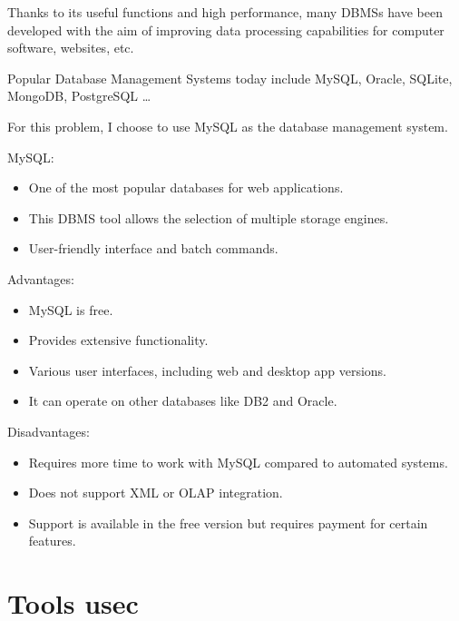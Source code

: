 \documentclass[../Main.tex]{subfiles}
\begin{document}
Thanks to its useful functions and high performance, many DBMSs have been developed with the aim of improving data processing capabilities for computer software, websites, etc.

Popular Database Management Systems today include MySQL, Oracle, SQLite, MongoDB, PostgreSQL \dots

For this problem, I choose to use MySQL as the database management system.

MySQL:

\begin{itemize}
    \item One of the most popular databases for web applications.
    \item This DBMS tool allows the selection of multiple storage engines.
    \item User-friendly interface and batch commands.
\end{itemize}

Advantages:

\begin{itemize}
    \item MySQL is free.
    \item Provides extensive functionality.
    \item Various user interfaces, including web and desktop app versions.
    \item It can operate on other databases like DB2 and Oracle.
\end{itemize}

Disadvantages:

\begin{itemize}
    \item Requires more time to work with MySQL compared to automated systems.
    \item Does not support XML or OLAP integration.
    \item Support is available in the free version but requires payment for certain features.
\end{itemize}

\section{Tools usec}
\end{document}

